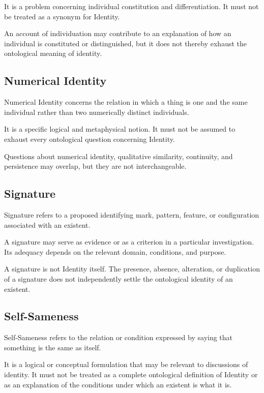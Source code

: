 It is a problem concerning individual constitution and differentiation.
It must not be treated as a synonym for Identity.

An account of individuation may contribute to an explanation of how
an individual is constituted or distinguished, but it does not thereby
exhaust the ontological meaning of identity.


\subsection*{Numerical Identity}

Numerical Identity concerns the relation in which a thing is one and
the same individual rather than two numerically distinct individuals.

It is a specific logical and metaphysical notion. It must not be assumed
to exhaust every ontological question concerning Identity.

Questions about numerical identity, qualitative similarity, continuity,
and persistence may overlap, but they are not interchangeable.


\subsection*{Signature}

Signature refers to a proposed identifying mark, pattern, feature,
or configuration associated with an existent.

A signature may serve as evidence or as a criterion in a particular
investigation. Its adequacy depends on the relevant domain, conditions,
and purpose.

A signature is not Identity itself. The presence, absence, alteration,
or duplication of a signature does not independently settle the
ontological identity of an existent.


\subsection*{Self-Sameness}

Self-Sameness refers to the relation or condition expressed by saying
that something is the same as itself.

It is a logical or conceptual formulation that may be relevant to
discussions of identity. It must not be treated as a complete ontological
definition of Identity or as an explanation of the conditions under
which an existent is what it is.

